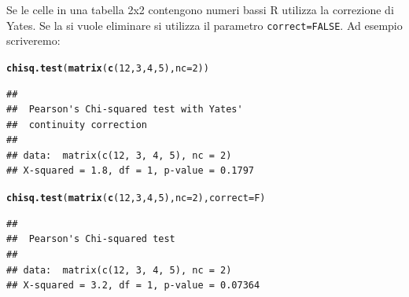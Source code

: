 \documentclass[onecolumn,12pt]{book}\usepackage[]{graphicx}\usepackage[]{color}
\makeatletter
\newcommand{\hlnum}[1]{\textcolor[rgb]{0.686,0.059,0.569}{#1}}%
\newcommand{\hlstd}[1]{\textcolor[rgb]{0.345,0.345,0.345}{#1}}%
\newcommand{\hlkwc}[1]{\textcolor[rgb]{0.333,0.667,0.333}{#1}}%
\newcommand{\hlkwd}[1]{\textcolor[rgb]{0.737,0.353,0.396}{\textbf{#1}}}%
\newenvironment{kframe}{%
 \def\at@end@of@kframe{}%
 \ifinner\ifhmode%
  \def\at@end@of@kframe{\end{minipage}}%
  \begin{minipage}{\columnwidth}%
 \fi\fi%
 \def\FrameCommand##1{\hskip\@totalleftmargin \hskip-\fboxsep
 \colorbox{shadecolor}{##1}\hskip-\fboxsep
     \hskip-\linewidth \hskip-\@totalleftmargin \hskip\columnwidth}%
 \MakeFramed {\advance\hsize-\width
   \@totalleftmargin\z@ \linewidth\hsize
   \@setminipage}}%
 {\par\unskip\endMakeFramed%
 \at@end@of@kframe}
\newenvironment{knitrout}{}{} %
\makeatother
\begin{document}
Se le celle in una tabella 2x2 contengono numeri bassi R utilizza la correzione di Yates. Se la si vuole eliminare  si utilizza il parametro  \texttt{correct=FALSE}.
Ad esempio scriveremo:
\begin{knitrout}
\color{fgcolor}\begin{kframe}
\begin{alltt}
\hlkwd{chisq.test}\hlstd{(}\hlkwd{matrix}\hlstd{(}\hlkwd{c}\hlstd{(}\hlnum{12}\hlstd{,}\hlnum{3}\hlstd{,}\hlnum{4}\hlstd{,}\hlnum{5}\hlstd{),}\hlkwc{nc}\hlstd{=}\hlnum{2}\hlstd{))}
\end{alltt}


{\ttfamily\noindent\color{warningcolor}{\#\# Warning in chisq.test(matrix(c(12, 3, 4, 5), nc = 2)): Chi-squared approximation may be incorrect}}\begin{verbatim}
## 
## 	Pearson's Chi-squared test with Yates'
## 	continuity correction
## 
## data:  matrix(c(12, 3, 4, 5), nc = 2)
## X-squared = 1.8, df = 1, p-value = 0.1797
\end{verbatim}
\begin{alltt}
\hlkwd{chisq.test}\hlstd{(}\hlkwd{matrix}\hlstd{(}\hlkwd{c}\hlstd{(}\hlnum{12}\hlstd{,}\hlnum{3}\hlstd{,}\hlnum{4}\hlstd{,}\hlnum{5}\hlstd{),}\hlkwc{nc}\hlstd{=}\hlnum{2}\hlstd{),}\hlkwc{correct}\hlstd{=F)}
\end{alltt}


{\ttfamily\noindent\color{warningcolor}{\#\# Warning in chisq.test(matrix(c(12, 3, 4, 5), nc = 2), correct = F): Chi-squared approximation may be incorrect}}\begin{verbatim}
## 
## 	Pearson's Chi-squared test
## 
## data:  matrix(c(12, 3, 4, 5), nc = 2)
## X-squared = 3.2, df = 1, p-value = 0.07364
\end{verbatim}
\end{kframe}
\end{knitrout}
\end{document}
